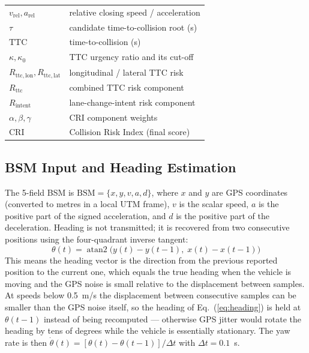 \documentclass[sn-mathphys-num,Numbered,iicol]{sn-jnl}
\DeclareMathOperator{\atantwo}{atan2}
\begin{document}
\begin{table}[htbp]
\begin{tabular}{@{}ll@{}}
    $v_{\mathrm{rel}}, a_{\mathrm{rel}}$ & relative closing speed / acceleration \\
    $\tau$                     & candidate time-to-collision root (s) \\
    $\mathrm{TTC}$             & time-to-collision (s)~\cite{hayward1972} \\
    $\kappa, \kappa_0$         & TTC urgency ratio and its cut-off \\
    $R_{\mathrm{ttc,lon}}, R_{\mathrm{ttc,lat}}$ & longitudinal / lateral TTC risk \\
    $R_{\mathrm{ttc}}$         & combined TTC risk component \\
    $R_{\mathrm{intent}}$      & lane-change-intent risk component \\
    $\alpha, \beta, \gamma$    & CRI component weights \\
    $\mathrm{CRI}$             & Collision Risk Index (final score) \\
    \bottomrule
  \end{tabular}
\end{table}

\subsection{BSM Input and Heading Estimation}
The 5-field BSM is $\mathrm{BSM} = \{x, y, v, a, d\}$, where $x$ and $y$ are GPS coordinates (converted to metres in a local UTM frame), $v$ is the scalar speed, $a$ is the positive part of the signed acceleration, and $d$ is the positive part of the deceleration. Heading is not transmitted; it is recovered from two consecutive positions using the four-quadrant inverse tangent:
\begin{equation}
\label{eq:heading}
  \theta(t) = \atantwo\!\bigl(y(t)-y(t-1),\; x(t)-x(t-1)\bigr)
\end{equation}
This means the heading vector is the direction from the previous reported position to the current one, which equals the true heading when the vehicle is moving and the GPS noise is small relative to the displacement between samples. At speeds below 0.5~m/s the displacement between consecutive samples can be smaller than the GPS noise itself, so the heading of Eq.~(\ref{eq:heading}) is held at $\theta(t-1)$ instead of being recomputed --- otherwise GPS jitter would rotate the heading by tens of degrees while the vehicle is essentially stationary. The yaw rate is then $\dot{\theta}(t) = [\theta(t) - \theta(t-1)]/\Delta t$ with $\Delta t = 0.1$~s.
\end{document}
